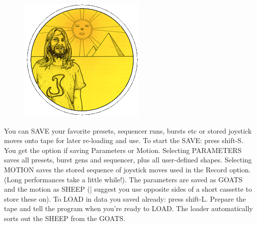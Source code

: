 \begin{definition}
\setlength{\intextsep}{0pt}%
\setlength{\columnsep}{3pt}%
\begin{figure}
\includegraphics[width=\linewidth]{src/callout/psych.png} 
\end{figure}
\small
You can SAVE your favorite presets,
sequencer runs, bursts etc or stored joystick moves onto tape for
later re-loading and use. To start the SAVE: press shift-S. You get
the option if saving Parameters or Motion. Selecting
PARAMETERS saves all presets, burst gens and sequencer, plus
all user-defined shapes. Selecting MOTION saves the stored
sequence of joystick moves used in the Record option. (Long
performances take a little while!). The parameters are saved as
GOATS and the motion as SHEEP (| suggest you use opposite sides
of a short cassette to store these on). To LOAD in data you saved
already: press shift-L. Prepare the tape and tell the program when
you're ready to LOAD. The loader automatically sorts out the
SHEEP from the GOATS.

\end{definition}
\clearpage
